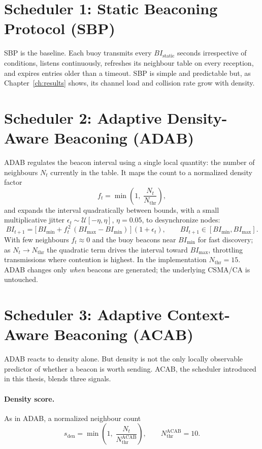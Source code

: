 \documentclass[12pt,a4paper,oneside]{report}
\newcommand{\bimin}{BI_{\min}}
\newcommand{\bimax}{BI_{\max}}
\newcommand{\nthr}{N_{\mathrm{thr}}}
\begin{document}
\section{Scheduler 1: Static Beaconing Protocol (SBP)}
SBP is the baseline. Each buoy transmits every $BI_{\text{static}}$ seconds
irrespective of conditions, listens continuously, refreshes its neighbour table
on every reception, and expires entries older than a timeout. SBP is simple and
predictable but, as Chapter~\ref{ch:results} shows, its channel load and
collision rate grow with density.

\section{Scheduler 2: Adaptive Density-Aware Beaconing (ADAB)}
ADAB regulates the beacon interval using a single local quantity: the number of
neighbours $N_t$ currently in the table. It maps the count to a normalized
density factor
\begin{equation}
  f_t = \min\!\left(1,\; \frac{N_t}{\nthr}\right),
\end{equation}
and expands the interval quadratically between bounds, with a small
multiplicative jitter $\epsilon_t\sim\mathcal{U}[-\eta,\eta]$, $\eta=0.05$, to
desynchronize nodes:
\begin{equation}
  BI_{t+1} = \Big[\,\bimin + f_t^{\,2}\,(\bimax-\bimin)\,\Big]\,(1+\epsilon_t),
  \qquad BI_{t+1}\in[\bimin,\bimax].
  \label{eq:adab}
\end{equation}
With few neighbours $f_t\approx 0$ and the buoy beacons near $\bimin$ for fast
discovery; as $N_t\to\nthr$ the quadratic term drives the interval toward
$\bimax$, throttling transmissions where contention is highest. In the
implementation $\nthr=15$. ADAB changes only \emph{when} beacons are generated;
the underlying CSMA/CA is untouched.

\section{Scheduler 3: Adaptive Context-Aware Beaconing (ACAB)}
\label{sec:acab}
ADAB reacts to density alone. But density is not the only locally observable
predictor of whether a beacon is worth sending. ACAB, the scheduler introduced
in this thesis, blends three signals.

\paragraph{Density score.} As in ADAB, a normalized neighbour count
\begin{equation}
  s_{\mathrm{den}} = \min\!\left(1,\;\frac{N_t}{\nthr^{\mathrm{ACAB}}}\right),
  \qquad \nthr^{\mathrm{ACAB}} = 10 .
\end{equation}
\end{document}

